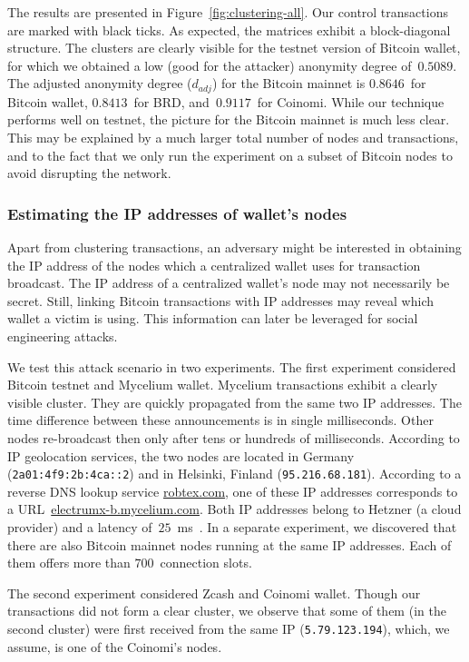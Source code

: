 The results are presented in Figure~\ref{fig:clustering-all}.
Our control transactions are marked with black ticks.
As expected, the matrices exhibit a block-diagonal structure.
The clusters are clearly visible for the testnet version of Bitcoin wallet, for which we obtained a low (good for the attacker) anonymity degree of~$0.5089$.
The adjusted anonymity degree ($d_{adj}$) for the Bitcoin mainnet is $0.8646$~for Bitcoin wallet, $0.8413$~for BRD, and~$0.9117$~for Coinomi.
While our technique performs well on testnet, the picture for the Bitcoin mainnet is much less clear.
This may be explained by a much larger total number of nodes and transactions, and to the fact that we only run the experiment on a subset of Bitcoin nodes to avoid disrupting the network.


\subsubsection*{Estimating the IP addresses of wallet's nodes}

Apart from clustering transactions, an adversary might be interested in obtaining the IP address of the nodes which a centralized wallet uses for transaction broadcast.
The IP address of a centralized wallet's node may not necessarily be secret.
Still, linking Bitcoin transactions with IP addresses may reveal which wallet a victim is using.
This information can later be leveraged for social engineering attacks.

We test this attack scenario in two experiments.
The first experiment considered Bitcoin testnet and Mycelium wallet.
Mycelium transactions exhibit a clearly visible cluster.
They are quickly propagated from the same two IP addresses.
The time difference between these announcements is in single milliseconds.
Other nodes re-broadcast then only after tens or hundreds of milliseconds.
According to IP geolocation services, the two nodes are located in Germany (\texttt{2a01:4f9:2b:4ca::2}) and in Helsinki, Finland (\texttt{95.216.68.181}).
According to a reverse DNS lookup service \url{robtex.com}, one of these IP addresses corresponds to a URL~\url{electrumx-b.mycelium.com}.
Both IP addresses belong to Hetzner (a cloud provider) and a latency of~$25$~ms~\cite{Bitnodes}.
In a separate experiment, we discovered that there are also Bitcoin mainnet nodes running at the same IP addresses.
Each of them offers more than $700$~connection slots.

The second experiment considered Zcash and Coinomi wallet.
Though our transactions did not form a clear cluster, we observe that some of them (in the second cluster) were first received from the same IP (\texttt{5.79.123.194}), which, we assume, is one of the Coinomi's nodes.


